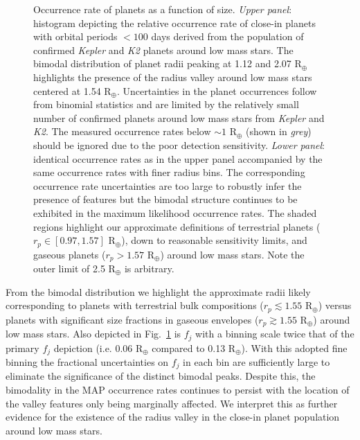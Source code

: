 \documentclass[twocolumn]{emulateapj}
\newcommand{\kepler}[1]{\emph{Kepler}#1}
\newcommand{\ktwo}[1]{\emph{K2}#1}
\begin{document}
  
\begin{figure}
  \centering
  \caption{Occurrence rate of planets as a function of size. \emph{Upper panel}:
    histogram depicting the relative occurrence
    rate of close-in planets with orbital periods $<100$ days derived from the population of confirmed
    \kepler{} and \ktwo{} planets around low mass stars. The bimodal distribution of planet radii peaking
    at 1.12 and 2.07 R$_{\oplus}$ highlights the presence of the radius valley around low mass stars centered at
    1.54 R$_{\oplus}$. Uncertainties in the planet occurrences follow from binomial statistics and are limited by
    the relatively small number of confirmed planets around low mass stars from \kepler{} and \ktwo{.} 
    The measured occurrence rates below $\sim 1$ R$_{\oplus}$ (shown in \emph{grey}) should be ignored due to
    the poor detection sensitivity. \emph{Lower panel}: identical occurrence rates as in the upper panel 
    accompanied by the same occurrence rates with finer radius bins.
    The corresponding occurrence rate uncertainties
    are too large to robustly infer the presence of features but the bimodal structure continues
    to be exhibited in the maximum likelihood occurrence rates. The shaded regions highlight our approximate
    definitions of terrestrial planets ($r_p \in [0.97,1.57]$ R$_{\oplus}$), down to reasonable sensitivity limits,
    and gaseous planets ($r_p > 1.57$ R$_{\oplus}$) around low mass stars. Note the outer limit of 2.5 R$_{\oplus}$
    is arbitrary.}
  \label{fig:rphist}
\end{figure}

From the bimodal distribution we highlight the approximate radii likely corresponding to planets with terrestrial
bulk compositions ($r_p\lesssim 1.55$ R$_{\oplus}$) versus planets with significant size fractions in gaseous
envelopes ($r_p\gtrsim 1.55$ R$_{\oplus}$) around
low mass stars. Also depicted in Fig.~\ref{fig:rphist} is $f_j$ with a binning scale twice that of the primary
$f_j$ depiction (i.e. 0.06 R$_{\oplus}$ compared to 0.13 R$_{\oplus}$).
With this adopted fine binning the fractional uncertainties on $f_j$ in each bin are sufficiently
large to eliminate the significance of the distinct bimodal peaks. Despite this, the bimodality in the MAP
occurrence rates continues to persist with the location of the valley features only being marginally affected.
We interpret this as further evidence for the existence of the radius valley in the close-in planet population
around low mass stars. 
\end{document}
